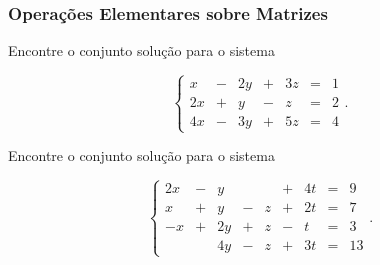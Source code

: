 
\begin{frame}
    \frametitle{Operações Elementares sobre Matrizes}

    \begin{exemplo}
        Encontre o conjunto solução para o sistema

        \[\left\{
        \begin{array}{rrrrrrr}
        x &-&2y &+ &3z &= &1 \\
        2x &+& y &-&z &= &2 \\
        4x &-&3y &+&5z &= &4  
        \end{array} \right..\]
    \end{exemplo} \pause
    
    \begin{exemplo}
        Encontre o conjunto solução para o sistema

        $$\left\{
        \begin{array}{rrrrrrrrr}
        2x &-&y & & &+ &4t &= &9 \\
        x &+& y &-&z & + & 2t&= &7 \\
        -x &+& 2y &+&z & - & t&= &3 \\
         & &4y &-&z &+ & 3t&= &13  
        \end{array} \right. .$$
    \end{exemplo}
    

\end{frame}


